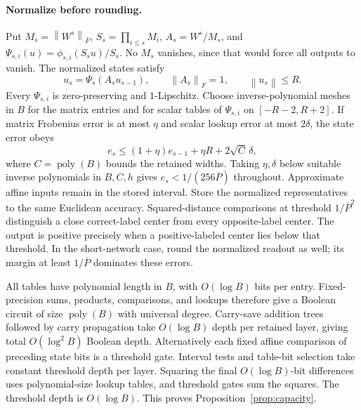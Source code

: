 \documentclass[11pt]{article}
\theoremstyle{remark}\newtheorem{remark}[theorem]{Remark}
\newcommand{\norm}[1]{\left\lVert#1\right\rVert}
\newcommand{\poly}{\operatorname{poly}}
\begin{document}
\paragraph{Normalize before rounding.}
Put $M_s=\norm{W^s}_F$, $S_s=\prod_{i\le s}M_i$,
$A_s=W^s/M_s$, and
$\Psi_{s,i}(u)=\phi_{s,i}(S_su)/S_s$. No $M_s$ vanishes,
since that would force all outputs to vanish. The normalized
states satisfy
\[
 u_s=\Psi_s(A_su_{s-1}),\qquad \norm{A_s}_F=1,\qquad
 \norm{u_s}\le R.
\]
Every $\Psi_{s,i}$ is zero-preserving and $1$-Lipschitz.
Choose inverse-polynomial meshes in $B$ for the matrix entries
and for scalar tables of $\Psi_{s,i}$ on $[-R-2,R+2]$.
If matrix Frobenius error is at most $\eta$ and scalar lookup
error at most $2\delta$, the state error obeys
\[
 e_s\le(1+\eta)e_{s-1}+\eta R+2\sqrt C\,\delta,
\]
where $C=\poly(B)$ bounds the retained widths.
Taking $\eta,\delta$ below suitable inverse polynomials in
$B,C,h$ gives $e_s<1/(256\overline P)$ throughout.
Approximate affine inputs remain in the stored interval.
Store the normalized representatives to the same Euclidean
accuracy. Squared-distance comparisons at threshold
$1/\overline P^2$ distinguish a close correct-label center from
every opposite-label center. The output is positive precisely
when a positive-labeled center lies below that threshold.
In the short-network case, round the normalized readout as
well; its margin at least $1/\overline P$ dominates these errors.

All tables have polynomial length in $B$, with $O(\log B)$ bits
per entry. Fixed-precision sums, products, comparisons, and
lookups therefore give a Boolean circuit of size $\poly(B)$
with universal degree. Carry-save addition trees followed by
carry propagation take $O(\log B)$ depth per retained layer,
giving total $O(\log^2 B)$ Boolean depth.
Alternatively each fixed affine comparison of preceding state
bits is a threshold gate. Interval tests and table-bit selection
take constant threshold depth per layer. Squaring the final
$O(\log B)$-bit differences uses polynomial-size lookup tables,
and threshold gates sum the squares. The threshold depth is
$O(\log B)$. This proves Proposition~\ref{prop:capacity}.




\end{document}
